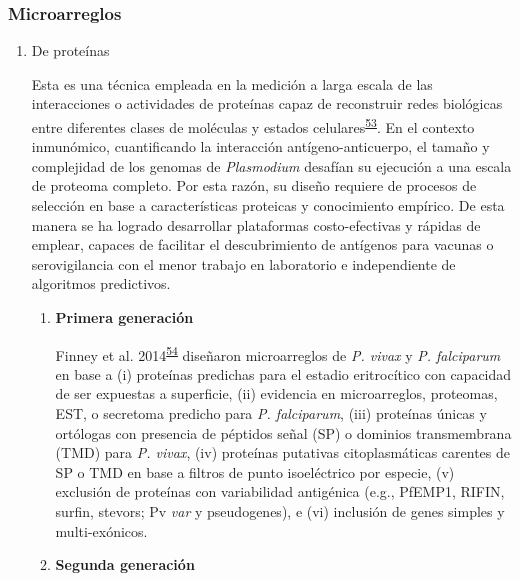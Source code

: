 \documentclass[]{article}
\begin{document}
\subsubsection{Microarreglos}\label{microarreglos}

\begin{enumerate}
\def\labelenumi{\alph{enumi}.}
\item
  De proteínas

  Esta es una técnica empleada en la medición a larga escala de las
  interacciones o actividades de proteínas capaz de reconstruir redes
  biológicas entre diferentes clases de moléculas y estados
  celulares\textsuperscript{\protect\hyperlink{ref-uzoma2013interactome}{53}}.
  En el contexto inmunómico, cuantificando la interacción
  antígeno-anticuerpo, el tamaño y complejidad de los genomas de
  \emph{Plasmodium} desafían su ejecución a una escala de proteoma
  completo. Por esta razón, su diseño requiere de procesos de selección
  en base a características proteicas y conocimiento empírico. De esta
  manera se ha logrado desarrollar plataformas costo-efectivas y rápidas
  de emplear, capaces de facilitar el descubrimiento de antígenos para
  vacunas o serovigilancia con el menor trabajo en laboratorio e
  independiente de algoritmos predictivos.

  \begin{enumerate}
  \def\labelenumii{\roman{enumii}.}
  \item
    \textbf{Primera generación}

    Finney et al.
    2014\textsuperscript{\protect\hyperlink{ref-Finney2014}{54}}
    diseñaron microarreglos de \emph{P. vivax} y \emph{P. falciparum} en
    base a (i) proteínas predichas para el estadio eritrocítico con
    capacidad de ser expuestas a superficie, (ii) evidencia en
    microarreglos, proteomas, EST, o secretoma predicho para \emph{P.
    falciparum}, (iii) proteínas únicas y ortólogas con presencia de
    péptidos señal (SP) o dominios transmembrana (TMD) para \emph{P.
    vivax}, (iv) proteínas putativas citoplasmáticas carentes de SP o
    TMD en base a filtros de punto isoeléctrico por especie, (v)
    exclusión de proteínas con variabilidad antigénica (e.g., PfEMP1,
    RIFIN, surfin, stevors; Pv \emph{var} y pseudogenes), e (vi)
    inclusión de genes simples y multi-exónicos.
  \item
    \textbf{Segunda generación}


\end{enumerate}
\end{enumerate}
\end{document}
